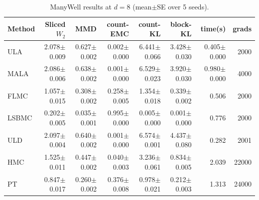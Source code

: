 \begin{table}[t]
\centering
\small
\caption{ManyWell results at $d=8$ (mean$\pm$SE over 5 seeds).}
\label{tab:manywell_d8}
\begin{tabular}{lrrrrrrr}
\toprule
Method & Sliced $W_2$ & MMD & count-EMC & count-KL & block-KL & time(s) & grads \\
\midrule
ULA & 2.078$\pm$0.009 & 0.627$\pm$0.002 & 0.002$\pm$0.000 & 6.441$\pm$0.066 & 3.428$\pm$0.030 & 0.405$\pm$0.000 & 2000 \\
MALA & 2.086$\pm$0.006 & 0.638$\pm$0.002 & 0.001$\pm$0.000 & 6.529$\pm$0.023 & 3.920$\pm$0.030 & 0.980$\pm$0.000 & 4000 \\
FLMC & 1.057$\pm$0.015 & 0.308$\pm$0.002 & 0.258$\pm$0.005 & 1.354$\pm$0.018 & 0.339$\pm$0.002 & 0.506 & 2000 \\
LSBMC & 0.202$\pm$0.005 & 0.035$\pm$0.001 & 0.995$\pm$0.000 & 0.005$\pm$0.000 & 0.001$\pm$0.000 & 0.776 & 2000 \\
ULD & 2.097$\pm$0.004 & 0.640$\pm$0.002 & 0.001$\pm$0.000 & 6.574$\pm$0.001 & 4.437$\pm$0.080 & 0.282 & 2001 \\
HMC & 1.525$\pm$0.011 & 0.447$\pm$0.002 & 0.040$\pm$0.003 & 3.236$\pm$0.061 & 0.834$\pm$0.005 & 2.039 & 22000 \\
PT & 0.847$\pm$0.017 & 0.260$\pm$0.002 & 0.376$\pm$0.008 & 0.978$\pm$0.021 & 0.212$\pm$0.003 & 1.313 & 24000 \\
\bottomrule
\end{tabular}
\end{table}